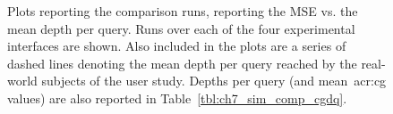 \begin{figure}[p!]
    \centering
    \caption[Comparison plots (result summaries)]{Plots reporting the comparison runs, reporting the MSE vs. the mean depth per query. Runs over each of the four experimental interfaces are shown. Also included in the plots are a series of dashed lines denoting the mean depth per query reached by the real-world subjects of the user study. Depths per query (and mean~\gls{acr:cg} values) are also reported in Table~\ref{tbl:ch7_sim_comp_cgdq}.}
    \label{fig:ch7_sim_comparison_plots}
\end{figure}


